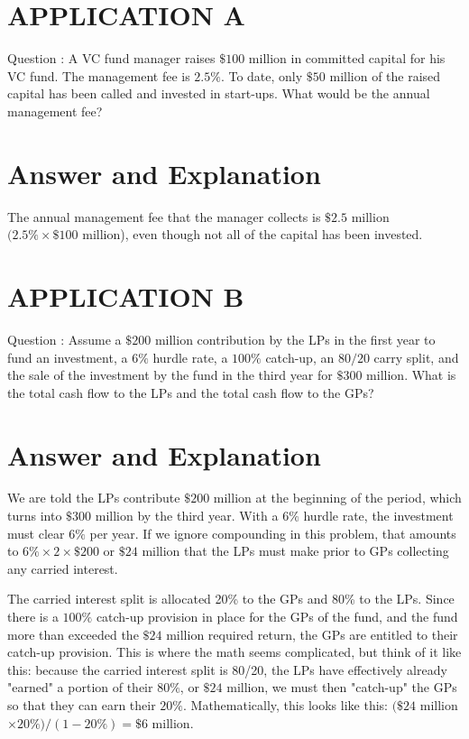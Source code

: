 \documentclass[11pt]{article}
\begin{document}
\section*{APPLICATION A}
Question : A VC fund manager raises $\$ 100$ million in committed capital for his VC fund. The management fee is $2.5 \%$. To date, only $\$ 50$ million of the raised capital has been called and invested in start-ups. What would be the annual management fee?

\section*{Answer and Explanation}
The annual management fee that the manager collects is $\$ 2.5$ million $(2.5 \% \times \$ 100$ million), even though not all of the capital has been invested.

\section*{APPLICATION B}
Question : Assume a $\$ 200$ million contribution by the LPs in the first year to fund an investment, a $6 \%$ hurdle rate, a $100 \%$ catch-up, an $80 / 20$ carry split, and the sale of the investment by the fund in the third year for $\$ 300$ million. What is the total cash flow to the LPs and the total cash flow to the GPs?

\section*{Answer and Explanation}
We are told the LPs contribute $\$ 200$ million at the beginning of the period, which turns into $\$ 300$ million by the third year. With a $6 \%$ hurdle rate, the investment must clear $6 \%$ per year. If we ignore compounding in this problem, that amounts to $6 \% \times 2 \times \$ 200$ or $\$ 24$ million that the LPs must make prior to GPs collecting any carried interest.

The carried interest split is allocated 20\% to the GPs and 80\% to the LPs. Since there is a $100 \%$ catch-up provision in place for the GPs of the fund, and the fund more than exceeded the $\$ 24$ million required return, the GPs are entitled to their catch-up provision. This is where the math seems complicated, but think of it like this: because the carried interest split is 80/20, the LPs have effectively already "earned" a portion of their $80 \%$, or $\$ 24$ million, we must then "catch-up" the GPs so that they can earn their $20 \%$. Mathematically, this looks like this: $(\$ 24$ million $\times 20 \%) /(1-20 \%)=\$ 6$ million.
\end{document}
